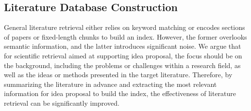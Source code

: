 \documentclass{article}
\theoremstyle{plain}
\theoremstyle{definition}
\theoremstyle{remark}
\newcommand\ie{\textit{i.e.}}
\newcommand\eg{\textit{e.g.}}
\begin{document}
\subsection{Literature Database Construction} \label{sec:liter-data-constrct}


General literature retrieval either relies on keyword matching or encodes sections of papers or fixed-length chunks to build an index. However, the former overlooks semantic information, and the latter introduces significant noise.
We argue that for scientific retrieval aimed at supporting idea proposal, the focus should be on the background, including the problems or challenges within a research field, as well as the ideas or methods presented in the target literature.
Therefore, by summarizing the literature in advance and extracting the most relevant information for idea proposal to build the index, the effectiveness of literature retrieval can be significantly improved.
\end{document}
